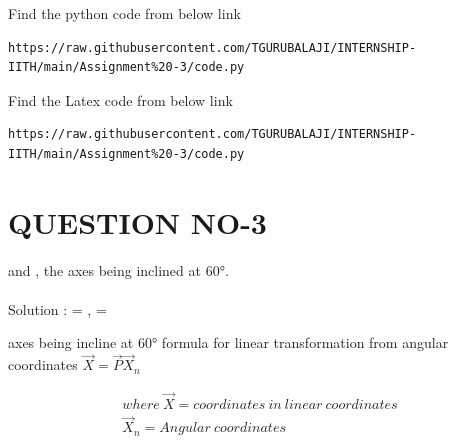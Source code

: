 \documentclass[journal,12pt,twocolumn]{IEEEtran}
\begin{document}
\maketitle
\newpage
\bigskip
\renewcommand{\thefigure}{\theenumi}
\renewcommand{\thetable}{\theenumi}
% 
Find the python code from below link
% 
\begin{lstlisting}
https://raw.githubusercontent.com/TGURUBALAJI/INTERNSHIP-IITH/main/Assignment%20-3/code.py
\end{lstlisting}
% 
Find the Latex code from below link
% 
\begin{lstlisting}
https://raw.githubusercontent.com/TGURUBALAJI/INTERNSHIP-IITH/main/Assignment%20-3/code.py
\end{lstlisting}

\section{QUESTION NO-3}
 \noindent {} and , the axes being inclined at \ang{60}.\\  
 
 \
 \\{Solution}
 :
 = ,  =
 
 axes being incline at \ang{60} formula for linear transformation from angular coordinates 
 $\vec{X} = \vec{P}\vec{X}_n$

\begin{align}
	where\ \vec{X}= coordinates\ in \ linear \ coordinates\\
	\vec{X}_n=Angular\ coordinates
\end{align}
\end{document}
